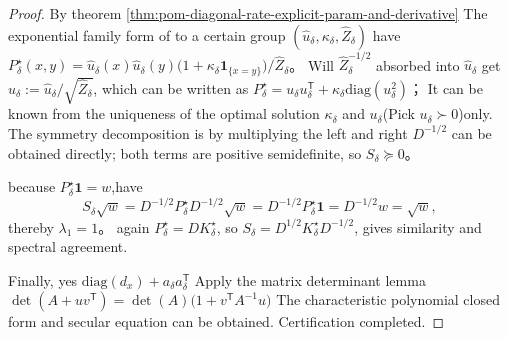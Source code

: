 \begin{proof}
By theorem \ref{thm:pom-diagonal-rate-explicit-param-and-derivative} The exponential family form of
to a certain group \((\widehat u_\delta,\kappa_\delta,\widehat Z_\delta)\) have
\(
P^\star_\delta(x,y)=\widehat u_\delta(x)\widehat u_\delta(y)\bigl(1+\kappa_\delta\mathbf 1_{\{x=y\}}\bigr)/\widehat Z_\delta
\)。
Will \(\widehat Z_\delta^{-1/2}\) absorbed into \(\widehat u_\delta\) get \(u_\delta:=\widehat u_\delta/\sqrt{\widehat Z_\delta}\), which can be written as
\(
P^\star_\delta=u_\delta u_\delta^{\mathsf T}+\kappa_\delta\mathrm{diag}(u_\delta^2)
\)；
It can be known from the uniqueness of the optimal solution \(\kappa_\delta\) and \(u_\delta\)(Pick \(u_\delta\succ0\))only.
The symmetry decomposition is by multiplying the left and right \(D^{-1/2}\) can be obtained directly; both terms are positive semidefinite, so \(S_\delta\succeq 0\)。
\par
because \(P^\star_\delta\mathbf 1=w\),have
\[
S_\delta\sqrt w
=D^{-1/2}P^\star_\delta D^{-1/2}\sqrt w
=D^{-1/2}P^\star_\delta\mathbf 1
=D^{-1/2}w
=\sqrt w,
\]
thereby \(\lambda_1=1\)。
again \(P^\star_\delta=D K^\star_\delta\), so
\(
S_\delta=D^{1/2}K^\star_\delta D^{-1/2}
\), gives similarity and spectral agreement.
\par
Finally, yes \(\mathrm{diag}(d_x)+a_\delta a_\delta^{\mathsf T}\) Apply the matrix determinant lemma
\(
\det(A+uv^{\mathsf T})=\det(A)\bigl(1+v^{\mathsf T}A^{-1}u\bigr)
\)
The characteristic polynomial closed form and secular equation can be obtained. Certification completed.
\end{proof}

